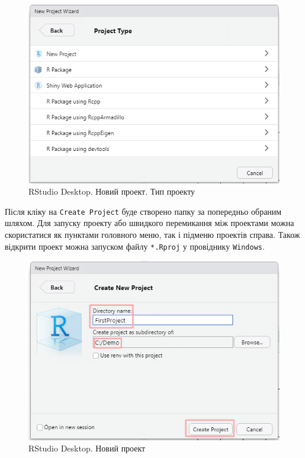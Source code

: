 \documentclass[
]{book}
\begin{document}
\begin{figure}
\centering
\includegraphics{images/chapter1/rstudio_7.png}
\caption{\label{fig:unnamed-chunk-18}RStudio Desktop. Новий проект. Тип проекту}
\end{figure}

Після кліку на \texttt{Create\ Project} буде створено папку за попередньо обраним шляхом. Для запуску проекту або швидкого перемикання між проектами можна скористатися як пунктами головного меню, так і підменю проектів справа. Також відкрити проект можна запуском файлу \texttt{*.Rproj} у провіднику \texttt{Windows}.

\begin{figure}
\centering
\includegraphics{images/chapter1/rstudio_8.png}
\caption{\label{fig:unnamed-chunk-19}RStudio Desktop. Новий проект}
\end{figure}
\end{document}
